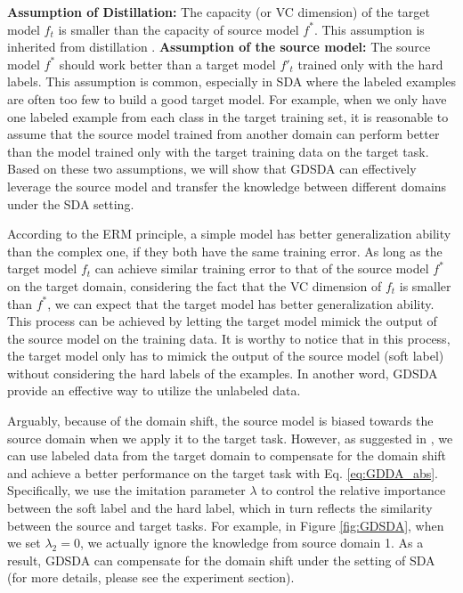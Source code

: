 \textbf{Assumption of Distillation:} The capacity (or VC dimension) of the target model $f_t$ is smaller than the capacity of source model $f^*$. This assumption is inherited from distillation \cite{lopez2015unifying}.
\textbf{Assumption of the source model:} The source model $f^*$ should work better than a target model $f'_t$ trained only with the hard labels. This assumption is common, especially in SDA where the labeled examples are often too few to build a good target model. For example, when we only have one labeled example from each class in the target training set, it is reasonable to assume that the source model trained from another domain can perform better than the model trained only with the target training data on the target task. Based on these two assumptions, we will show that GDSDA can effectively leverage the source model and transfer the knowledge between different domains under the SDA setting.

According to the ERM principle\cite{vapnik1999overview}, a simple model has better generalization ability than the complex one, if they both have the same training error.
As long as the target model $f_t$ can achieve similar training error to that of the source model $f^*$ on the target domain, considering the fact that the VC dimension of $f_t$ is smaller than $f^*$, we can expect that the target model has better generalization ability. This process can be achieved by letting the target model mimick the output of the source model on the training data.
It is worthy to notice that in this process, the target model only has to mimick the output of the source model (soft label) without considering the hard labels of the examples. In another word, GDSDA provide an effective way to utilize the unlabeled data.

Arguably, because of the domain shift, the source model is biased towards the source domain when we apply it to the target task. However, as suggested in \cite{hinton2015distilling}, we can use labeled data from the target domain to compensate for the domain shift and achieve a better performance on the target task with Eq. \eqref{eq:GDDA_abs}. Specifically, we use the imitation parameter $\lambda$ to control the relative importance between the soft label and the hard label, which in turn reflects the similarity between the source and target tasks. 
For example, in Figure \ref{fig:GDSDA}, when we set $\lambda_2=0$, we actually ignore the knowledge from source domain 1.
As a result, GDSDA can compensate for the domain shift under the setting of SDA (for more details, please see the experiment section).

